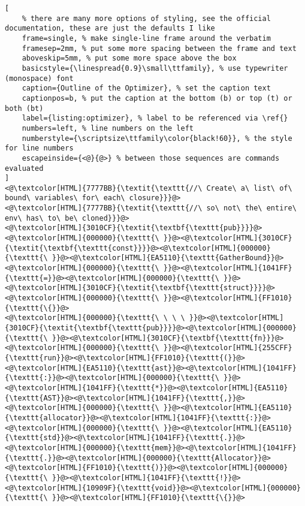 \begin{lstlisting}[
	% there are many more options of styling, see the official documentation, these are just the defaults I like
	frame=single, % make single-line frame around the verbatim
	framesep=2mm, % put some more spacing between the frame and text
	aboveskip=5mm, % put some more space above the box
	basicstyle={\linespread{0.9}\small\ttfamily}, % use typewriter (monospace) font
	caption={Outline of the Optimizer}, % set the caption text
	captionpos=b, % put the caption at the bottom (b) or top (t) or both (bt)
    label={listing:optimizer}, % label to be referenced via \ref{}
	numbers=left, % line numbers on the left
	numberstyle={\scriptsize\ttfamily\color{black!60}}, % the style for line numbers
	escapeinside={<@}{@>} % between those sequences are commands evaluated
]
<@\textcolor[HTML]{7777BB}{\textit{\texttt{//\ Create\ a\ list\ of\ bound\ variables\ for\ each\ closure}}}@>
<@\textcolor[HTML]{7777BB}{\textit{\texttt{//\ so\ not\ the\ entire\ env\ has\ to\ be\ cloned}}}@>
<@\textcolor[HTML]{3010CF}{\textit{\textbf{\texttt{pub}}}}@><@\textcolor[HTML]{000000}{\texttt{\ }}@><@\textcolor[HTML]{3010CF}{\textit{\textbf{\texttt{const}}}}@><@\textcolor[HTML]{000000}{\texttt{\ }}@><@\textcolor[HTML]{EA5110}{\texttt{GatherBound}}@><@\textcolor[HTML]{000000}{\texttt{\ }}@><@\textcolor[HTML]{1041FF}{\texttt{=}}@><@\textcolor[HTML]{000000}{\texttt{\ }}@><@\textcolor[HTML]{3010CF}{\textit{\textbf{\texttt{struct}}}}@><@\textcolor[HTML]{000000}{\texttt{\ }}@><@\textcolor[HTML]{FF1010}{\texttt{\{}}@>
<@\textcolor[HTML]{000000}{\texttt{\ \ \ \ }}@><@\textcolor[HTML]{3010CF}{\textit{\textbf{\texttt{pub}}}}@><@\textcolor[HTML]{000000}{\texttt{\ }}@><@\textcolor[HTML]{3010CF}{\textbf{\texttt{fn}}}@><@\textcolor[HTML]{000000}{\texttt{\ }}@><@\textcolor[HTML]{255CFF}{\texttt{run}}@><@\textcolor[HTML]{FF1010}{\texttt{(}}@><@\textcolor[HTML]{EA5110}{\texttt{ast}}@><@\textcolor[HTML]{1041FF}{\texttt{:}}@><@\textcolor[HTML]{000000}{\texttt{\ }}@><@\textcolor[HTML]{1041FF}{\texttt{*}}@><@\textcolor[HTML]{EA5110}{\texttt{AST}}@><@\textcolor[HTML]{1041FF}{\texttt{,}}@><@\textcolor[HTML]{000000}{\texttt{\ }}@><@\textcolor[HTML]{EA5110}{\texttt{allocator}}@><@\textcolor[HTML]{1041FF}{\texttt{:}}@><@\textcolor[HTML]{000000}{\texttt{\ }}@><@\textcolor[HTML]{EA5110}{\texttt{std}}@><@\textcolor[HTML]{1041FF}{\texttt{.}}@><@\textcolor[HTML]{000000}{\texttt{mem}}@><@\textcolor[HTML]{1041FF}{\texttt{.}}@><@\textcolor[HTML]{000000}{\texttt{Allocator}}@><@\textcolor[HTML]{FF1010}{\texttt{)}}@><@\textcolor[HTML]{000000}{\texttt{\ }}@><@\textcolor[HTML]{1041FF}{\texttt{!}}@><@\textcolor[HTML]{10909F}{\texttt{void}}@><@\textcolor[HTML]{000000}{\texttt{\ }}@><@\textcolor[HTML]{FF1010}{\texttt{\{}}@>

\end{lstlisting}
